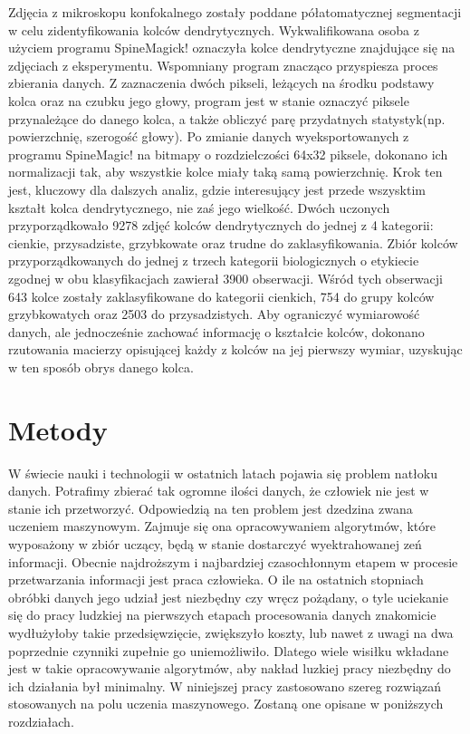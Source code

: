 \documentclass{article}
\begin{document}
Zdjęcia z mikroskopu konfokalnego zostały poddane półatomatycznej segmentacji w celu zidentyfikowania kolców dendrytycznych. 
Wykwalifikowana osoba z użyciem programu SpineMagick! oznaczyła kolce dendrytyczne znajdujące się na zdjęciach z eksperymentu.
Wspomniany program znacząco przyspiesza proces zbierania danych.
Z zaznaczenia dwóch pikseli, leżących na środku podstawy kolca oraz na czubku jego głowy, program jest w stanie oznaczyć piksele przynależące do danego kolca, a także obliczyć parę przydatnych statystyk(np. powierzchnię, szerogość głowy).
Po zmianie danych wyeksportowanych z programu SpineMagic! na bitmapy o rozdzielczości 64x32 piksele, dokonano ich normalizacji tak, aby wszystkie kolce miały taką samą powierzchnię.
Krok ten jest, kluczowy dla dalszych analiz, gdzie interesujący jest przede wszysktim kształt kolca dendrytycznego, nie zaś jego wielkość.
Dwóch uczonych przyporządkowało 9278 zdjęć kolców dendrytycznych do jednej z 4 kategorii: cienkie, przysadziste, grzybkowate oraz trudne do zaklasyfikowania.
Zbiór kolców przyporządkowanych do jednej z trzech kategorii biologicznych o etykiecie zgodnej w obu klasyfikacjach zawierał 3900 obserwacji.
Wśród tych obserwacji 643 kolce zostały zaklasyfikowane do kategorii cienkich, 754 do grupy kolców grzybkowatych oraz 2503 do przysadzistych.
Aby ograniczyć wymiarowość danych, ale jednocześnie zachować informację o kształcie kolców, dokonano rzutowania macierzy opisującej każdy z kolców na jej pierwszy wymiar, uzyskując w ten sposób obrys danego kolca.


\section{Metody}
W świecie nauki i technologii w ostatnich latach pojawia się problem natłoku danych.
Potrafimy zbierać tak ogromne ilości danych, że człowiek nie jest w stanie ich przetworzyć.
Odpowiedzią na ten problem jest dzedzina zwana uczeniem maszynowym. 
Zajmuje się ona opracowywaniem algorytmów, które wyposażony w zbiór uczący, będą w stanie dostarczyć wyektrahowanej zeń informacji.
Obecnie najdroższym i najbardziej czasochłonnym etapem w procesie przetwarzania informacji jest praca człowieka.
O ile na ostatnich stopniach obróbki danych jego udział jest niezbędny czy wręcz pożądany, o tyle uciekanie się do pracy ludzkiej na pierwszych etapach procesowania danych znakomicie wydłużyłoby takie przedsięwzięcie, zwiększyło koszty, lub nawet z uwagi na dwa poprzednie czynniki zupełnie go uniemożliwiło.
Dlatego wiele wisiłku wkładane jest w takie opracowywanie algorytmów, aby nakład luzkiej pracy niezbędny do ich działania był minimalny.
W niniejszej pracy zastosowano szereg rozwiązań stosowanych na polu uczenia maszynowego.
Zostaną one opisane w poniższych rozdziałach.
\end{document}
